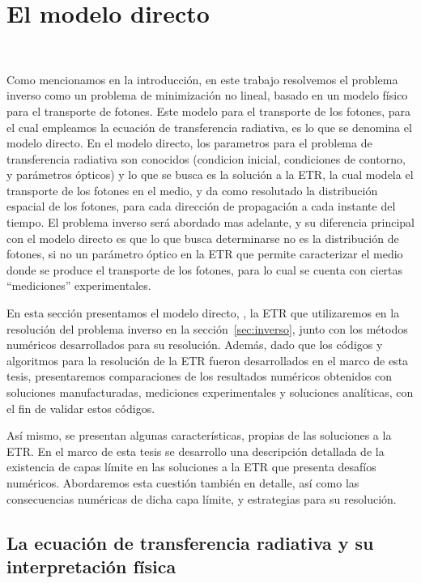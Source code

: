 \chapter{El modelo directo}
\lhead{\thepage}
 \\
\vspace{0.01\textheight}


Como mencionamos en la introducción, en este trabajo resolvemos el problema inverso 
como un problema de minimización no lineal, basado en un modelo físico para 
el transporte de fotones. Este modelo para el transporte de los fotones, 
para el cual empleamos la ecuación de transferencia radiativa, es lo que 
se denomina el modelo directo. En el modelo directo, los parametros 
 para el problema de transferencia radiativa son conocidos (condicion inicial, condiciones de contorno, 
y parámetros ópticos) y lo que se busca es la solución a la ETR, la cual modela 
el transporte de los fotones en el medio, y da como resolutado la distribución 
espacial de los fotones, para cada dirección de propagación a cada instante del tiempo. 
El problema inverso será abordado mas adelante, 
y su diferencia principal con el modelo directo es que lo que busca 
determinarse no es la distribución de fotones, si no un parámetro óptico en la ETR 
que permite caracterizar el medio donde se produce el transporte de los fotones, 
para lo cual se cuenta con ciertas ``mediciones'' experimentales.

En esta sección presentamos el modelo directo, \ie, 
la ETR que utilizaremos 
en la resolución del problema inverso en la sección~\ref{sec:inverso}, 
junto con los métodos numéricos desarrollados para su resolución. 
Además, dado que los códigos y algoritmos para la resolución de la ETR 
fueron desarrollados en el marco de esta tesis, presentaremos 
comparaciones de los resultados numéricos obtenidos con soluciones manufacturadas, 
mediciones experimentales y soluciones analíticas, con el fin de validar estos códigos.  

Así mismo, se presentan algunas características, propias de las soluciones 
a la ETR. En el marco de esta tesis se desarrollo una descripción detallada 
de la existencia de capas límite en las soluciones a la ETR que 
presenta desafíos numéricos. Abordaremos esta cuestión también en detalle, 
así como las consecuencias numéricas de dicha capa límite, y 
estrategias para su resolución. 


\section{La ecuación de transferencia radiativa y su interpretación física}
\label{sec:ETR}

